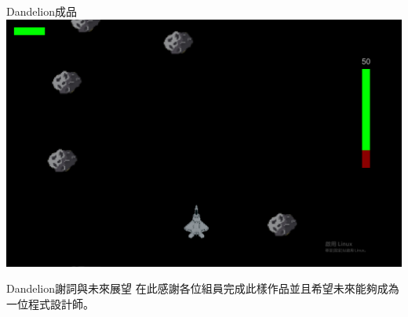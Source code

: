 \documentclass{article}
\begin{document}
\begin{large}
\begin{boxpar}{Dandelion}{成品}
    \includegraphics[width=\linewidth]{src/game.png}
\end{boxpar}
\begin{boxpar}{Dandelion}{謝詞與未來展望}
    在此感謝各位組員完成此樣作品並且希望未來能夠成為一位程式設計師。
\end{boxpar}
\end{large}
\end{document}
